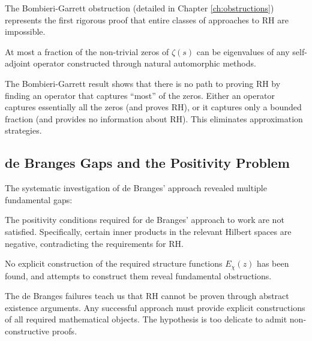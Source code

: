 The Bombieri-Garrett obstruction (detailed in Chapter \ref{ch:obstructions}) represents the first rigorous proof that entire classes of approaches to RH are impossible.

\begin{theorem}
At most a fraction of the non-trivial zeros of $\zeta(s)$ can be eigenvalues of any self-adjoint operator constructed through natural automorphic methods.
\end{theorem}

\begin{lesson}
The Bombieri-Garrett result shows that there is no path to proving RH by finding an operator that captures ``most'' of the zeros. Either an operator captures essentially all the zeros (and proves RH), or it captures only a bounded fraction (and provides no information about RH). This eliminates approximation strategies.
\end{lesson}

\subsection{de Branges Gaps and the Positivity Problem}
\label{subsec:debranges_gaps}

The systematic investigation of de Branges' approach revealed multiple fundamental gaps:

\begin{theorem}
The positivity conditions required for de Branges' approach to work are not satisfied. Specifically, certain inner products in the relevant Hilbert spaces are negative, contradicting the requirements for RH.
\end{theorem}

\begin{theorem}
No explicit construction of the required structure functions $E_\chi(z)$ has been found, and attempts to construct them reveal fundamental obstructions.
\end{theorem}

\begin{lesson}
The de Branges failures teach us that RH cannot be proven through abstract existence arguments. Any successful approach must provide explicit constructions of all required mathematical objects. The hypothesis is too delicate to admit non-constructive proofs.
\end{lesson}

